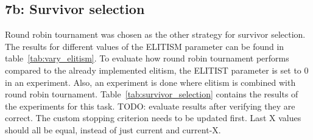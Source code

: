 \documentclass{report}
\begin{document}
\begin{table}[H]
	\centering
	\caption{Results when using Fitness Proportional Selection as parent selection method.}
	\label{tab:selparentfitprop}
\end{table}

\subsection{7b: Survivor selection}
Round robin tournament was chosen as the other strategy for survivor selection. The results for different values of the ELITISM parameter can be found in table~\ref{tab:vary_elitism}. To evaluate how round robin tournament performs compared to the already implemented elitism, the ELITIST parameter is set to 0 in an experiment. Also, an experiment is done where elitism is combined with round robin tournament. Table~\ref{tab:survivor_selection} contains the results of the experiments for this task. TODO: evaluate results after verifying they are correct. The custom stopping criterion needs to be updated first. Last X values should all be equal, instead of just current and current-X.

\end{document}
